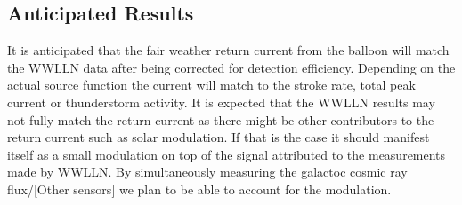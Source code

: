 \documentclass[12pt, letterpaper, onecolumn, oneside]{article}
\begin{document}
\subsection*{Anticipated Results}

It is anticipated that the fair weather return current from the balloon will match the WWLLN data after being corrected for detection efficiency. Depending on the actual source function the current will match to the stroke rate, total peak current or thunderstorm activity. It is expected that the WWLLN results may not fully match the return current as there might be other contributors to the return current such as solar modulation. If that is the case it should manifest itself as a small modulation on top of the signal attributed to the measurements made by WWLLN. By simultaneously measuring the galactoc cosmic ray flux/[Other sensors] we plan to be able to account for the modulation.



\end{document}
